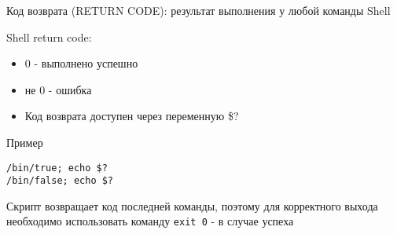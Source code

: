 \begin{frame}[fragile]

  \Large{\alert{Код возврата (RETURN CODE)}}: \newline 
  \normalsize{результат выполнения у любой команды Shell}
  \newline

  Shell return code:
  \begin{itemize}
    \item 0 - выполнено успешно
    \item не 0 - ошибка
    \item Код возврата доступен через переменную \$?
  \end{itemize}

	\pause
	\begin{block}{Пример}
		\begin{lstlisting}
/bin/true; echo $?
/bin/false; echo $?
		\end{lstlisting}
	\end{block}

	Скрипт возвращает код последней команды, поэтому для корректного выхода необходимо использовать команду {\tt exit 0} - в случае успеха

\end{frame}
